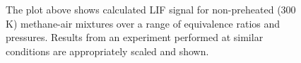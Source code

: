 \begin{figure}

\centering



\caption[Methane flames - I]{The plot above shows calculated LIF signal for non-preheated (300 K) methane-air mixtures over a range of equivalence ratios and pressures. Results from an experiment performed at similar conditions are appropriately scaled and shown.}

\label{fig:01-300}

\end{figure}

